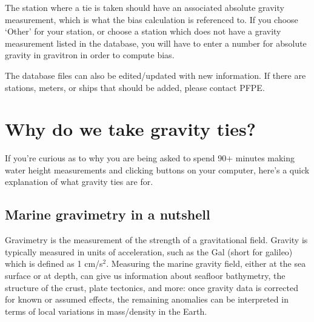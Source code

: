 \documentclass{pfpe-manual}
\begin{document}
The station where a tie is taken should have an associated absolute gravity measurement, which is what the bias calculation is referenced to. If you choose `Other' for your station, or choose a station which does not have a gravity measurement listed in the database, you will have to enter a number for absolute gravity in gravitron in order to compute bias.


The database files can also be edited/updated with new information. If there are stations, meters, or ships that should be added, please contact PFPE.

\section{Why do we take gravity ties?}
If you're curious as to why you are being asked to spend 90+ minutes making water height measurements and clicking buttons on your computer, here's a quick explanation of what gravity ties are for.

\subsection{Marine gravimetry in a nutshell}
Gravimetry is the measurement of the strength of a gravitational field. Gravity is typically measured in units of acceleration, such as the Gal (short for galileo) which is defined as 1 cm/s$^2$. Measuring the marine gravity field, either at the sea surface or at depth, can give us information about seafloor bathymetry, the structure of the crust, plate tectonics, and more: once gravity data is corrected for known or assumed effects, the remaining anomalies can be interpreted in terms of local variations in mass/density in the Earth.
\end{document}
